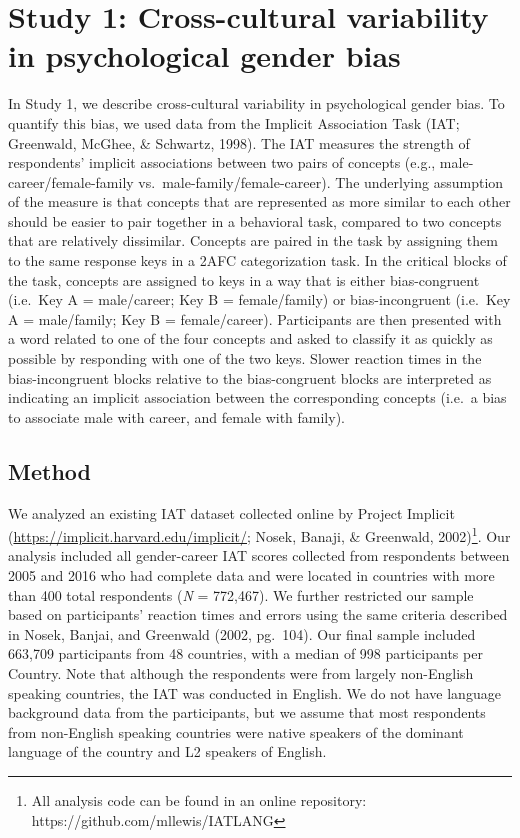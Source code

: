 \documentclass[10pt, letterpaper]{article}
\begin{document}
\section{Study 1: Cross-cultural variability in psychological gender
bias}\label{study-1-cross-cultural-variability-in-psychological-gender-bias}

In Study 1, we describe cross-cultural variability in psychological
gender bias. To quantify this bias, we used data from the Implicit
Association Task (IAT; Greenwald, McGhee, \& Schwartz, 1998). The IAT
measures the strength of respondents' implicit associations between two
pairs of concepts (e.g., male-career/female-family
vs.~male-family/female-career). The underlying assumption of the measure
is that concepts that are represented as more similar to each other
should be easier to pair together in a behavioral task, compared to two
concepts that are relatively dissimilar. Concepts are paired in the task
by assigning them to the same response keys in a 2AFC categorization
task. In the critical blocks of the task, concepts are assigned to keys
in a way that is either bias-congruent (i.e.~Key A = male/career; Key B
= female/family) or bias-incongruent (i.e.~Key A = male/family; Key B =
female/career). Participants are then presented with a word related to
one of the four concepts and asked to classify it as quickly as possible
by responding with one of the two keys. Slower reaction times in the
bias-incongruent blocks relative to the bias-congruent blocks are
interpreted as indicating an implicit association between the
corresponding concepts (i.e.~a bias to associate male with career, and
female with family).

\subsection{Method}\label{method}

We analyzed an existing IAT dataset collected online by Project Implicit
(\url{https://implicit.harvard.edu/implicit/}; Nosek, Banaji, \&
Greenwald,
2002)\footnote{All analysis code can be found in an online repository: https://github.com/mllewis/IATLANG}.
Our analysis included all gender-career IAT scores collected from
respondents between 2005 and 2016 who had complete data and were located
in countries with more than 400 total respondents (\emph{N} = 772,467).
We further restricted our sample based on participants' reaction times
and errors using the same criteria described in Nosek, Banjai, and
Greenwald (2002, pg.~104). Our final sample included 663,709
participants from 48 countries, with a median of 998 participants per
Country. Note that although the respondents were from largely
non-English speaking countries, the IAT was conducted in English. We do
not have language background data from the participants, but we assume
that most respondents from non-English speaking countries were native
speakers of the dominant language of the country and L2 speakers of
English.
\end{document}

